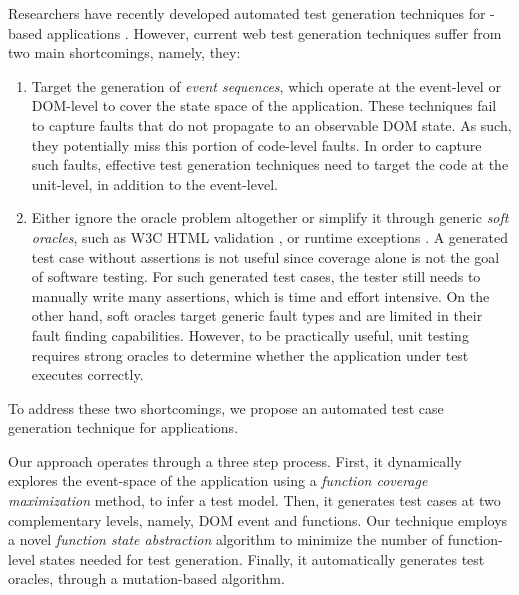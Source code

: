 Researchers have recently developed automated test generation techniques for \javascript-based applications \cite{artzi:icse11, marchetto:search, tonella:icst08, mesbah:tse12, song:symb10}. However, current web test generation techniques suffer from two main  shortcomings, namely, they:

\begin{enumerate}
\item Target the generation of \emph{event sequences}, which operate at the event-level or DOM-level to cover the state space of the application. These techniques fail to capture faults that  do not propagate to an observable DOM state. As such, they potentially miss this portion of code-level \javascript faults. In order to capture such faults, effective test generation techniques need to target the code at the \javascript unit-level, in addition to the event-level.
\item Either ignore the oracle problem altogether or simplify it through generic \emph{soft oracles}, such as  W3C HTML  validation \cite{artzi:icse11,mesbah:tse12}, or  \javascript runtime exceptions \cite{artzi:icse11}.
A generated test case without assertions is not useful since coverage alone is not the goal of software testing. For such generated test cases, the tester still needs to  manually write many assertions, which is time and effort intensive. 
On the other hand, soft oracles  target generic fault types and are limited in their fault finding capabilities.   %
However, to be practically useful, unit testing requires strong oracles  to determine whether the application under test executes correctly.
\end{enumerate}
To address these two shortcomings, we propose an automated test case  generation technique for \javascript applications. 

Our approach operates through a three step process. 
First, it dynamically explores the event-space of the application using a \emph{function coverage maximization} method, to infer a test model. Then, it generates test cases at two complementary levels, namely, DOM event and \javascript functions. Our technique employs a novel \emph{function state abstraction} algorithm to minimize the number of function-level states needed for test generation.
Finally,  it automatically generates test oracles, through a mutation-based algorithm.


